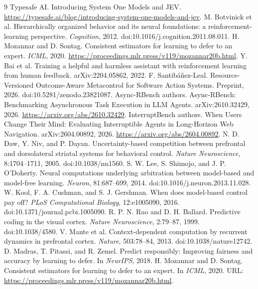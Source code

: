 \documentclass[11pt]{article}
\begin{document}
\begin{thebibliography}{9}\small\setlength{\itemsep}{0pt}
 Typesafe AI. Introducing System One Models and JEV. \url{https://typesafe.ai/blog/introducing-system-one-models-and-jev}.
 M. Botvinick et al. Hierarchically organized behavior and its neural foundations: a reinforcement-learning perspective. \emph{Cognition}, 2012. doi:10.1016/j.cognition.2011.08.011.
 H. Mozannar and D. Sontag. Consistent estimators for learning to defer to an expert. \emph{ICML}, 2020. \url{https://proceedings.mlr.press/v119/mozannar20b.html}.
 Y. Bai et al. Training a helpful and harmless assistant with reinforcement learning from human feedback. arXiv:2204.05862, 2022.
 F. Santibáñez-Leal. Resource-Versioned Outcome-Aware Metacontrol for Software Action Systems. Preprint, 2026. doi:10.5281/zenodo.23821087.
 Async-RBench authors. Async-RBench: Benchmarking Asynchronous Task Execution in LLM Agents. arXiv:2610.32429, 2026. \url{https://arxiv.org/abs/2610.32429}.
 InterruptBench authors. When Users Change Their Mind: Evaluating Interruptible Agents in Long-Horizon Web Navigation. arXiv:2604.00892, 2026. \url{https://arxiv.org/abs/2604.00892}.
 N. D. Daw, Y. Niv, and P. Dayan. Uncertainty-based competition between prefrontal and dorsolateral striatal systems for behavioral control. \emph{Nature Neuroscience}, 8:1704--1711, 2005. doi:10.1038/nn1560.
 S. W. Lee, S. Shimojo, and J. P. O'Doherty. Neural computations underlying arbitration between model-based and model-free learning. \emph{Neuron}, 81:687--699, 2014. doi:10.1016/j.neuron.2013.11.028.
 W. Kool, F. A. Cushman, and S. J. Gershman. When does model-based control pay off? \emph{PLoS Computational Biology}, 12:e1005090, 2016. doi:10.1371/journal.pcbi.1005090.
 R. P. N. Rao and D. H. Ballard. Predictive coding in the visual cortex. \emph{Nature Neuroscience}, 2:79--87, 1999. doi:10.1038/4580.
 V. Mante et al. Context-dependent computation by recurrent dynamics in prefrontal cortex. \emph{Nature}, 503:78--84, 2013. doi:10.1038/nature12742.
 D. Madras, T. Pitassi, and R. Zemel. Predict responsibly: Improving fairness and accuracy by learning to defer. In \emph{NeurIPS}, 2018.
 H. Mozannar and D. Sontag. Consistent estimators for learning to defer to an expert. In \emph{ICML}, 2020. URL: \url{https://proceedings.mlr.press/v119/mozannar20b.html}.

\end{thebibliography}
\end{document}
